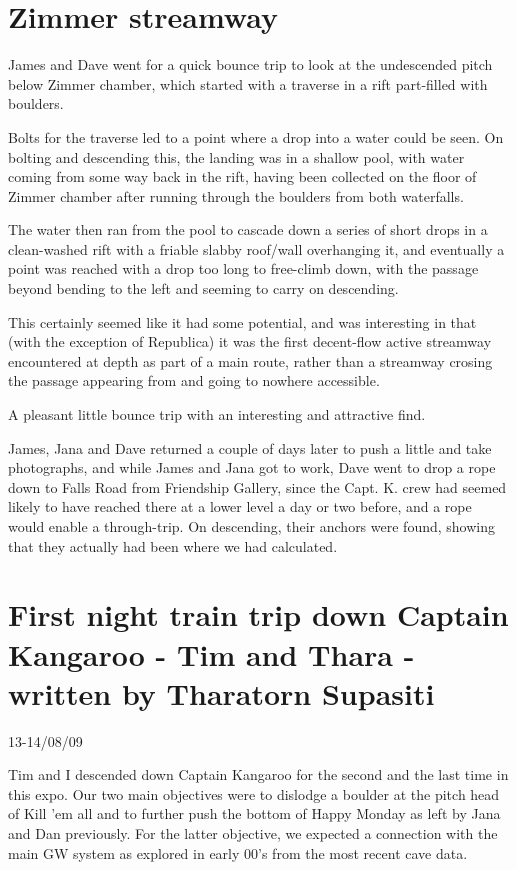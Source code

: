 \section{Zimmer streamway}\label{zimmer-streamway}

James and Dave went for a quick bounce trip to look at the undescended
pitch below Zimmer chamber, which started with a traverse in a rift
part-filled with boulders.

Bolts for the traverse led to a point where a drop into a water could be
seen. On bolting and descending this, the landing was in a shallow pool,
with water coming from some way back in the rift, having been collected
on the floor of Zimmer chamber after running through the boulders from
both waterfalls.

The water then ran from the pool to cascade down a series of short drops
in a clean-washed rift with a friable slabby roof/wall overhanging it,
and eventually a point was reached with a drop too long to free-climb
down, with the passage beyond bending to the left and seeming to carry
on descending.

This certainly seemed like it had some potential, and was interesting in
that (with the exception of Republica) it was the first decent-flow
active streamway encountered at depth as part of a main route, rather
than a streamway crosing the passage appearing from and going to nowhere
accessible.

A pleasant little bounce trip with an interesting and attractive find.

James, Jana and Dave returned a couple of days later to push a little
and take photographs, and while James and Jana got to work, Dave went to
drop a rope down to Falls Road from Friendship Gallery, since the Capt.
K. crew had seemed likely to have reached there at a lower level a day
or two before, and a rope would enable a through-trip. On descending,
their anchors were found, showing that they actually had been where we
had calculated.


\section{First night train trip down Captain Kangaroo - Tim and Thara -
written by Tharatorn
Supasiti}\label{first-night-train-trip-down-captain-kangaroo---tim-and-thara---written-by-tharatorn-supasiti}

13-14/08/09

Tim and I descended down Captain Kangaroo for the second and the last
time in this expo. Our two main objectives were to dislodge a boulder at
the pitch head of Kill 'em all and to further push the bottom of Happy
Monday as left by Jana and Dan previously. For the latter objective, we
expected a connection with the main GW system as explored in early 00's
from the most recent cave data.

